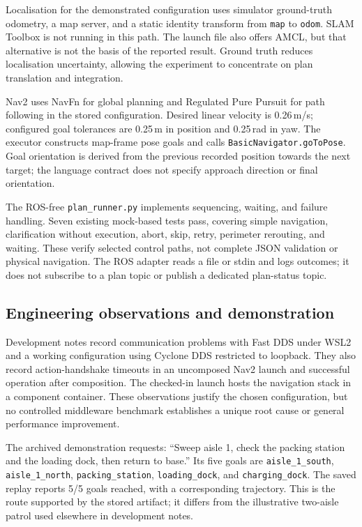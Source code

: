 \documentclass[journal]{IEEEtran}
\newcommand{\field}[1]{\texttt{#1}}
\begin{document}
Localisation for the demonstrated configuration uses simulator ground-truth odometry, a map server, and a static identity transform from \field{map} to \field{odom}. SLAM Toolbox is not running in this path. The launch file also offers AMCL, but that alternative is not the basis of the reported result. Ground truth reduces localisation uncertainty, allowing the experiment to concentrate on plan translation and integration.

Nav2 uses NavFn for global planning and Regulated Pure Pursuit for path following in the stored configuration. Desired linear velocity is 0.26\,m/s; configured goal tolerances are 0.25\,m in position and 0.25\,rad in yaw. The executor constructs map-frame pose goals and calls \field{BasicNavigator.goToPose}. Goal orientation is derived from the previous recorded position towards the next target; the language contract does not specify approach direction or final orientation.

The ROS-free \field{plan\_runner.py} implements sequencing, waiting, and failure handling. Seven existing mock-based tests pass, covering simple navigation, clarification without execution, abort, skip, retry, perimeter rerouting, and waiting. These verify selected control paths, not complete JSON validation or physical navigation. The ROS adapter reads a file or stdin and logs outcomes; it does not subscribe to a plan topic or publish a dedicated plan-status topic.

\subsection{Engineering observations and demonstration}
Development notes record communication problems with Fast DDS under WSL2 and a working configuration using Cyclone DDS restricted to loopback. They also record action-handshake timeouts in an uncomposed Nav2 launch and successful operation after composition. The checked-in launch hosts the navigation stack in a component container. These observations justify the chosen configuration, but no controlled middleware benchmark establishes a unique root cause or general performance improvement.

The archived demonstration requests: ``Sweep aisle 1, check the packing station and the loading dock, then return to base.'' Its five goals are \field{aisle\_1\_south}, \field{aisle\_1\_north}, \field{packing\_station}, \field{loading\_dock}, and \field{charging\_dock}. The saved replay reports 5/5 goals reached, with a corresponding trajectory. This is the route supported by the stored artifact; it differs from the illustrative two-aisle patrol used elsewhere in development notes.
\end{document}
